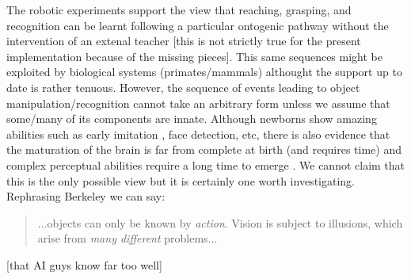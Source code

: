 The robotic experiments support the view that reaching, grasping, and recognition
can be learnt following a particular ontogenic pathway without the
intervention of an extenal teacher [this is not strictly true for
the present implementation because of the missing pieces].
This same sequences might be exploited by biological systems (primates/mammals)
althought the support up to date is rather tenuous. However, the 
sequence of events leading to object manipulation/recognition cannot take
an arbitrary form unless we assume that some/many of its components are innate.
Although newborns show amazing abilities \cite{spelke-2000} such as early imitation 
\cite{meltzoff-moore-1977}, face detection, etc, there is also evidence 
that the maturation of the brain is far from complete at birth (and requires time) and
complex perceptual abilities require a long time to emerge \cite{kovacs00human}.
We cannot claim that this is the only possible view but it is certainly one worth
investigating. Rephrasing Berkeley we can say:
\begin{quote}
...objects can only be known by
\emph{action}. Vision is subject to illusions, 
which arise from \emph{many different} problems...
\end{quote}
[that AI guys know far too well]




